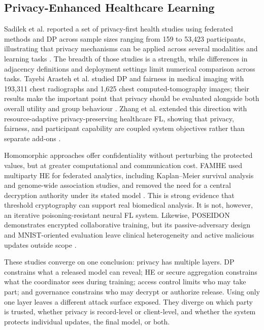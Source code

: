 \subsection{Privacy-Enhanced Healthcare Learning}

Sadilek et al. reported a set of privacy-first health studies using federated methods and DP across sample sizes ranging from 159 to 53,423 participants, illustrating that privacy mechanisms can be applied across several modalities and learning tasks \cite{sadilek2021privacy}. The breadth of those studies is a strength, while differences in adjacency definitions and deployment settings limit numerical comparison across tasks. Tayebi Arasteh et al. studied DP and fairness in medical imaging with 193,311 chest radiographs and 1,625 chest computed-tomography images; their results make the important point that privacy should be evaluated alongside both overall utility and group behaviour \cite{tayebi2024differential}. Zhang et al. extended this direction with resource-adaptive privacy-preserving healthcare FL, showing that privacy, fairness, and participant capability are coupled system objectives rather than separate add-ons \cite{zhang2025fairness}.

Homomorphic approaches offer confidentiality without perturbing the protected values, but at greater computational and communication cost. FAMHE used multiparty HE for federated analytics, including Kaplan--Meier survival analysis and genome-wide association studies, and removed the need for a central decryption authority under its stated model \cite{froelicher2021famh}. This is strong evidence that threshold cryptography can support real biomedical analysis. It is not, however, an iterative poisoning-resistant neural FL system. Likewise, POSEIDON demonstrates encrypted collaborative training, but its passive-adversary design and MNIST-oriented evaluation leave clinical heterogeneity and active malicious updates outside scope \cite{sav2021poseidon}.

These studies converge on one conclusion: privacy has multiple layers. DP constrains what a released model can reveal; HE or secure aggregation constrains what the coordinator sees during training; access control limits who may take part; and governance constrains who may decrypt or authorize release. Using only one layer leaves a different attack surface exposed. They diverge on which party is trusted, whether privacy is record-level or client-level, and whether the system protects individual updates, the final model, or both.

